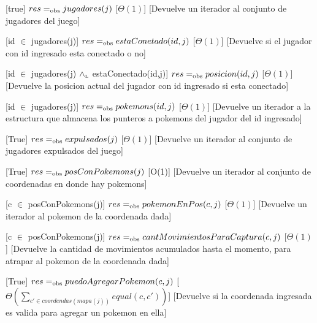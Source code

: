 \begin{Interfaz}
  [true]
  {$res =_{\mathrm{obs}} jugadores(j)$}
  [$\Theta(1)$]
  [Devuelve un iterador al conjunto de jugadores del juego]

  [id $\in$ jugadores(j)]
  {$res =_{\mathrm{obs}} estaConetado(id,j)$}
  [$\Theta(1)$]
  [Devuelve si el jugador con id ingresado esta conectado o no]

  [id $\in$ jugadores(j) $\land_{\mathrm{\scriptscriptstyle{L}}}$ estaConectado(id,j)]
  {$res =_{\mathrm{obs}} posicion(id,j)$}
  [$\Theta(1)$]
  [Devuelve la posicion actual del jugador con id ingresado si esta conectado]

  [id $\in$ jugadores(j)]
  {$res =_{\mathrm{obs}} pokemons(id,j)$}
  [$\Theta(1)$]
  [Devuelve un iterador a la estructura que almacena los punteros a pokemons del jugador del id ingresado]

  [True]
  {$res =_{\mathrm{obs}} expulsados(j)$}
  [$\Theta(1)$]
  [Devuelve un iterador al conjunto de jugadores expulsados del juego]

  [True]
  {$res =_{\mathrm{obs}} posConPokemons(j)$}
  [O(1)]
  [Devuelve un iterador al conjunto de coordenadas en donde hay pokemons]

  [c $\in$ posConPokemons(j)]
  {$res =_{\mathrm{obs}} pokemonEnPos(c,j)$}
  [$\Theta(1)$] %
  [Devuelve un iterador al pokemon de la coordenada dada]

  [c $\in$ posConPokemons(j)]
  {$res =_{\mathrm{obs}} cantMovimientosParaCaptura(c,j)$}
  [$\Theta(1)$] %
  [Devuelve la cantidad de movimientos acumulados hasta el momento, para atrapar al pokemon de la coordenada dada]

  [True]
  {$res =_{\mathrm{obs}} puedoAgregarPokemon(c,j)$}
  [$\Theta\left(\displaystyle\sum_{c' \in coordendas(mapa(j))}equal(c,c')\right)$]
  [Devuelve si la coordenada ingresada es valida para agregar un pokemon en ella]


\end{Interfaz}
